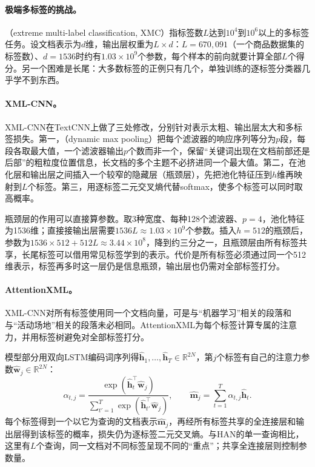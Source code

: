 \paragraph{极端多标签的挑战。}（extreme multi-label classification, XMC）指标签数$L$达到$10^4$到$10^6$以上的多标签任务。设文档表示为$d$维，输出层权重为$L\times d$：$L=670{,}091$（一个商品数据集的标签数）、$d=1536$时约有$1.03\times10^9$个参数，每个样本的前向就要计算全部$L$个得分。另一个困难是长尾：大多数标签的正例只有几个，单独训练的逐标签分类器几乎学不到东西。

\paragraph{XML-CNN。}XML-CNN在TextCNN上做了三处修改，分别针对表示太粗、输出层太大和多标签损失。第一，（dynamic max pooling）把每个滤波器的响应序列等分为$p$段，每段各取最大值，一个滤波器输出$p$个数而非一个，保留“关键词出现在文档前部还是后部”的粗粒度位置信息，长文档的多个主题不必挤进同一个最大值。第二，在池化层和输出层之间插入一个较窄的隐藏层（瓶颈层），先把池化特征压到$h$维再映射到$L$个标签。第三，用逐标签二元交叉熵代替softmax，使多个标签可以同时取高概率。

瓶颈层的作用可以直接算参数。取3种宽度、每种128个滤波器、$p=4$，池化特征为1536维；直接接输出层需要$1536L\approx1.03\times10^9$个参数。插入$h=512$的瓶颈后，参数为$1536\times512+512L\approx3.44\times10^8$，降到约三分之一，且瓶颈层由所有标签共享，长尾标签可以借用常见标签学到的表示。代价是所有标签必须通过同一个512维表示，标签再多时这一层仍是信息瓶颈，输出层也仍需对全部标签打分。

\paragraph{AttentionXML。}XML-CNN对所有标签使用同一个文档向量，可是与“机器学习”相关的段落和与“活动场地”相关的段落未必相同。AttentionXML为每个标签计算专属的注意力，并用标签树避免对全部标签打分。

模型部分用双向LSTM编码词序列得$\hat{\bm h}_1,\ldots,\hat{\bm h}_T\in\mathbb R^{2N}$，第$j$个标签有自己的注意力参数$\hat{\bm w}_j\in\mathbb R^{2N}$：
\begin{equation}
  \label{eq:nlp-classification-label-attention}
  \alpha_{t,j}=\frac{\exp(\hat{\bm h}_t^\top\hat{\bm w}_j)}{\sum_{t'=1}^{T}\exp(\hat{\bm h}_{t'}^\top\hat{\bm w}_j)},\qquad
  \hat{\bm m}_j=\sum_{t=1}^{T}\alpha_{t,j}\hat{\bm h}_t.
\end{equation}
每个标签得到一个以它为查询的文档表示$\hat{\bm m}_j$，再经所有标签共享的全连接层和输出层得到该标签的概率，损失仍为逐标签二元交叉熵。与HAN的单一查询相比，这里有$L$个查询，同一文档对不同标签呈现不同的“重点”；共享全连接层则控制参数量。

